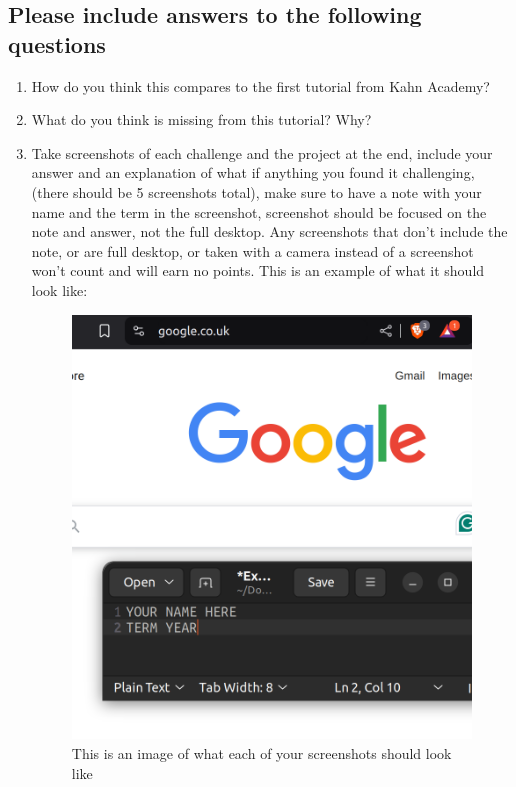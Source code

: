\documentclass[12pt]{article}
\begin{document}
\subsection*{Please include answers to the following questions}
    \begin{enumerate}
        \item How do you think this compares to the first tutorial from  Kahn Academy?
        \item What do you think is missing from this tutorial? Why? 
        \item Take screenshots of each challenge and the project at the end, include your answer and an explanation of what if anything you found it challenging, (there should be 5 screenshots total), make sure to have a note with your name and the term in the screenshot, screenshot should be focused on the note and answer, not the full desktop.  Any screenshots that don't include the note, or are full desktop, or taken with a camera instead of a screenshot won't count and will earn no points. This is an example of what it should look like:        
 
        \begin{figure}[h!]
            \centerline{\includegraphics[scale=.2]{ExampleScreenshot.png}}
            \caption{This is an image of what each of your screenshots should look like}

            \end{figure} 
    \end{enumerate}
\end{document}
